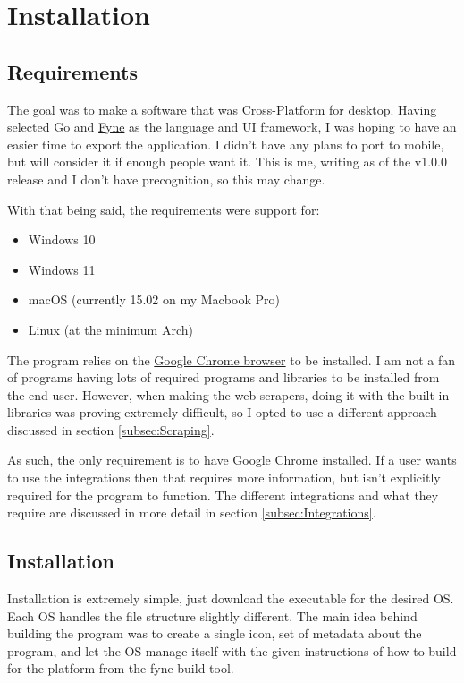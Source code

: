 \section{Installation}

\subsection{Requirements}

The goal was to make a software that was Cross-Platform for desktop.
Having selected Go and \href{https://fyne.io/}{Fyne} as the language and UI
framework, I was hoping to have an easier time to export the application.
I didn't have any plans to port to mobile, but will consider it if
enough people want it. This is me, writing as of the v1.0.0 release
and I don't have precognition, so this may change.

With that being said, the requirements were support for:
\begin{itemize}
	\item Windows 10
	\item Windows 11
	\item macOS (currently 15.02 on my Macbook Pro)
	\item Linux (at the minimum Arch)
\end{itemize}

The program relies on the
\href{https://www.google.com/chrome/}{Google Chrome browser} to be installed.
I am not a fan of programs having lots of required programs and
libraries to be installed from the end user.
However, when making the web scrapers, doing it with the built-in
libraries was proving extremely difficult, so I opted to use a
different approach discussed in section \ref{subsec:Scraping}.

As such, the only requirement is to have Google Chrome installed.
If a user wants to use the integrations then that requires more
information, but isn't explicitly required for the program to function.
The different integrations and what they require are discussed in
more detail in section \ref{subsec:Integrations}.

\subsection{Installation}
\label{subsec:Installation}

Installation is extremely simple, just download the executable for
the desired OS.
Each OS handles the file structure slightly different.
The main idea behind building the program was to create a single
icon, set of metadata about
the program, and let the OS manage itself with the given instructions
of how to build for the platform from the fyne build tool.

